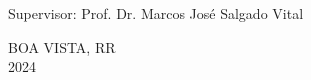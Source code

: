     \vspace{2cm}
    \begin{flushright}
    Supervisor: Prof. Dr. Marcos José Salgado Vital
    \end{flushright}
    \vfill
    \begin{center}
    \MakeUppercase{Boa Vista, RR}\\
    2024
    \end{center}
    
    \justifying

